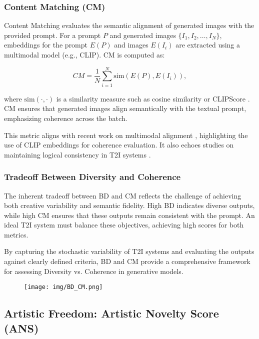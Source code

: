 \subsubsection{Content Matching (CM)}
Content Matching evaluates the semantic alignment of generated images with the provided prompt. For a prompt \(P\) and generated images \(\{I_1, I_2, \dots, I_N\}\), embeddings for the prompt \(E(P)\) and images \(E(I_i)\) are extracted using a multimodal model (e.g., CLIP). CM is computed as:

\begin{equation}
    CM = \frac{1}{N} \sum_{i=1}^{N} \text{sim}(E(P), E(I_i)),
\end{equation}

where \(\text{sim}(\cdot, \cdot)\) is a similarity measure such as cosine similarity or CLIPScore \cite{srinivas2021clipscore}. CM ensures that generated images align semantically with the textual prompt, emphasizing coherence across the batch.

This metric aligns with recent work on multimodal alignment \cite{srinivas2021clipscore}, highlighting the use of CLIP embeddings for coherence evaluation. It also echoes studies on maintaining logical consistency in T2I systems \cite{lee2021multi}.

\subsubsection{Tradeoff Between Diversity and Coherence}
The inherent tradeoff between BD and CM reflects the challenge of achieving both creative variability and semantic fidelity. High BD indicates diverse outputs, while high CM ensures that these outputs remain consistent with the prompt. An ideal T2I system must balance these objectives, achieving high scores for both metrics.

By capturing the stochastic variability of T2I systems and evaluating the outputs against clearly defined criteria, BD and CM provide a comprehensive framework for assessing Diversity vs. Coherence in generative models.

\begin{figure}[h!]
    \centering
    \texttt{[image: img/BD\_CM.png]}
    \caption{}
    \label{fig:}
\end{figure}




\subsection{Artistic Freedom: Artistic Novelty Score (ANS)}

